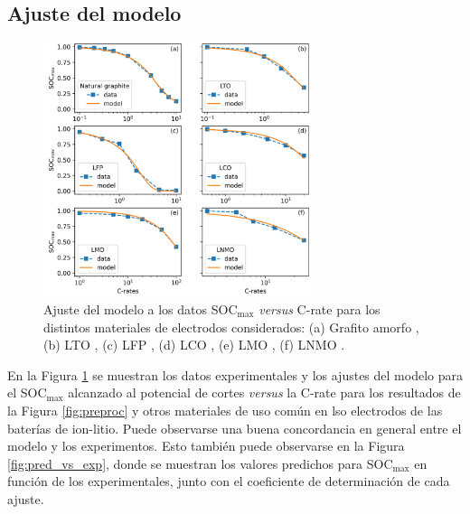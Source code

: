 \subsection{Ajuste del modelo}

\begin{figure}[h!]
    \centering
    \includegraphics[width=0.7\textwidth]{FastCharging/un/resultados/ajuste/ajustes.png}
    \caption{Ajuste del modelo a los datos SOC$_{\max}$ \textit{versus} C-rate
    para los distintos materiales de electrodos considerados: (a) Grafito 
    amorfo \cite{mancini2022}, (b) LTO \cite{he2012}, (c) LFP \cite{lei2015}, 
    (d) LCO \cite{wang2019high}, (e) LMO \cite{bak2011}, (f) LNMO
    \cite{nishikawa2017}.}
    \label{fig:ajustes}
\end{figure}

En la Figura \ref{fig:ajustes} se muestran los datos experimentales y los 
ajustes del modelo para el SOC$_{\max}$ alcanzado al potencial de cortes 
\textit{versus} la C-rate para los resultados de la Figura \ref{fig:preproc}
y otros materiales de uso común en lso electrodos de las baterías de ion-litio.
Puede observarse una buena concordancia en general entre el modelo y los 
experimentos. Esto también puede observarse en la Figura \ref{fig:pred_vs_exp},
donde se muestran los valores predichos para SOC$_{\max}$ en función de los
experimentales, junto con el coeficiente de determinación de cada ajuste.

